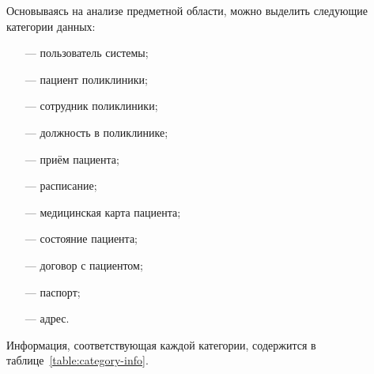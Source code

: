 Основываясь на анализе предметной области, можно выделить следующие категории данных:
\begin{itemize}[leftmargin=1.6\parindent]
	\item[---] пользователь системы;
	\item[---] пациент поликлиники;
	\item[---] сотрудник поликлиники;
	\item[---] должность в поликлинике;
	\item[---] приём пациента;
	\item[---] расписание;
	\item[---] медицинская карта пациента;
	\item[---] состояние пациента;
	\item[---] договор с пациентом;
	\item[---] паспорт;
	\item[---] адрес.
\end{itemize}

Информация, соответствующая каждой категории, содержится в таблице~\ref{table:category-info}.

\clearpage


